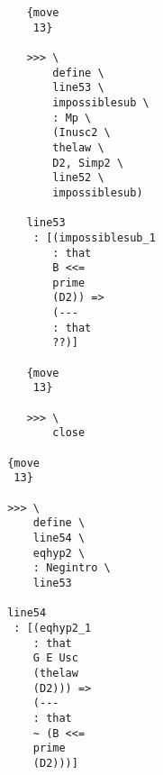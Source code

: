\documentclass[12pt]{article}
\begin{document}
\begin{verbatim}
                                          {move 
                                           13}

                                          >>> \
                                              define \
                                              line53 \
                                              impossiblesub \
                                              : Mp \
                                              (Inusc2 \
                                              thelaw \
                                              D2, Simp2 \
                                              line52 \
                                              impossiblesub)

                                          line53 
                                           : [(impossiblesub_1 
                                              : that 
                                              B <<= 
                                              prime 
                                              (D2)) => 
                                              (--- 
                                              : that 
                                              ??)]

                                          {move 
                                           13}

                                          >>> \
                                              close

                                       {move 
                                        13}

                                       >>> \
                                           define \
                                           line54 \
                                           eqhyp2 \
                                           : Negintro \
                                           line53

                                       line54 
                                        : [(eqhyp2_1 
                                           : that 
                                           G E Usc 
                                           (thelaw 
                                           (D2))) => 
                                           (--- 
                                           : that 
                                           ~ (B <<= 
                                           prime 
                                           (D2)))]


\end{verbatim}
\end{document}
